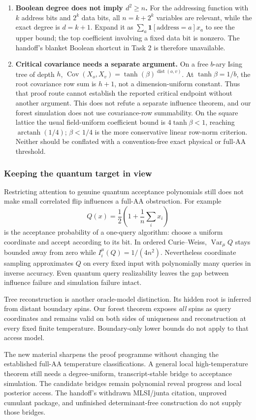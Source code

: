 \begin{enumerate}
\item \textbf{Boolean degree does not imply $d^2\ge n$.}
For the addressing function with $k$ address bits and $2^k$ data bits,
all $n=k+2^k$ variables are relevant, while the exact degree is $d=k+1$.
Expand it as $\sum_a\mathbf1[\text{address}=a]x_a$ to see the upper
bound; the top coefficient involving a fixed data bit is nonzero.
The handoff's blanket Boolean shortcut in Task 2 is therefore unavailable.

\item \textbf{Critical covariance needs a separate argument.}
On a free $b$-ary Ising tree of depth $h$,
$\operatorname{Cov}(X_o,X_v)=\tanh(\beta)^{\operatorname{dist}(o,v)}$.
At $\tanh\beta=1/b$, the root covariance row sum is $h+1$, not a
dimension-uniform constant. Thus that proof route cannot establish the
reported critical endpoint without another argument. This does not
refute a separate influence theorem, and our forest simulation does
not use covariance-row summability. On the square lattice the usual
field-uniform coefficient bound is $4\tanh\beta<1$, reaching
$\operatorname{arctanh}(1/4)$; $\beta<1/4$ is the more conservative
linear row-norm criterion. Neither should be conflated with a
convention-free exact physical or full-AA threshold.
\end{enumerate}

\subsubsection{Keeping the quantum target in view}

Restricting attention to genuine quantum acceptance polynomials still
does not make small correlated flip influences a full-AA obstruction.
For example
\[
 Q(x)=\frac12\left(1+\frac1n\sum_i x_i\right)
\]
is the acceptance probability of a one-query algorithm: choose a
uniform coordinate and accept according to its bit. In ordered
Curie--Weiss, $\operatorname{Var}_\mu Q$ stays bounded away from zero
while $I_i^\mu(Q)=1/(4n^2)$. Nevertheless coordinate sampling
approximates $Q$ on every fixed input with polynomially many queries
in inverse accuracy. Even quantum query realizability leaves the gap
between influence failure and simulation failure intact.

Tree reconstruction is another oracle-model distinction. Its hidden
root is inferred from distant boundary spins. Our forest theorem exposes
\emph{all} spins as query coordinates and remains valid on both sides
of uniqueness and reconstruction at every fixed finite temperature.
Boundary-only lower bounds do not apply to that access model.

The new material sharpens the proof programme without changing the
established full-AA temperature classifications. A general local
high-temperature theorem still needs a degree-uniform,
transcript-stable bridge to acceptance simulation. The candidate
bridges remain polynomial reveal progress and local posterior access.
The handoff's withdrawn MLSI/junta citation, unproved cumulant package,
and unfinished determinant-free construction do not supply those bridges.
